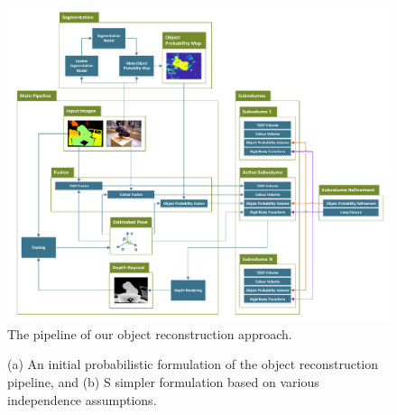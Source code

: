 \begin{figure}[!t]
	\centering
	\includegraphics[width=0.7\linewidth]{pipeline.pdf}
	\caption{The pipeline of our object reconstruction approach.}
	\label{pipelineDiagram}
\end{figure}

\begin{figure}[!t]
	\centering
	\hspace{12mm}%
	\caption{(a) An initial probabilistic formulation of the object reconstruction pipeline, and (b) S simpler formulation based on various independence assumptions.}
\end{figure}